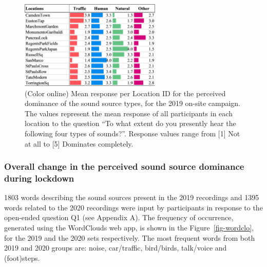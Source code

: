 \documentclass[
  authoryear,
  preprint,
  3p,
  onecolumn]{elsarticle}
\begin{document}
\begin{figure}

{\centering \includegraphics[width=0.6\textwidth,height=\textheight]{Figure2.jpg}

}

\caption{\label{fig-barchart}(Color online) Mean response per Location
ID for the perceived dominance of the sound source types, for the 2019
on-site campaign. The values represent the mean response of all
participants in each location to the question ``To what extent do you
presently hear the following four types of sounds?''. Response values
range from {[}1{]} Not at all to {[}5{]} Dominates completely.}

\end{figure}

\hypertarget{overall-change-in-the-perceived-sound-source-dominance-during-lockdown}{%
\subsubsection{Overall change in the perceived sound source dominance
during
lockdown}\label{overall-change-in-the-perceived-sound-source-dominance-during-lockdown}}

1803 words describing the sound sources present in the 2019 recordings
and 1395 words related to the 2020 recordings were input by participants
in response to the open-ended question Q1 (see Appendix A). The
frequency of occurrence, generated using the WordClouds web app, is
shown in the Figure~\ref{fig-wordclo}, for the 2019 and the 2020 sets
respectively. The most frequent words from both 2019 and 2020 groups
are: noise, car/traffic, bird/birds, talk/voice and (foot)steps.
\end{document}
